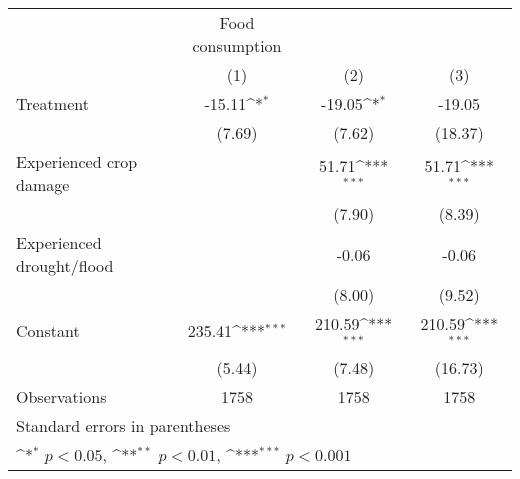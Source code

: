 {
\def\sym#1{\ifmmode^{#1}\else\(^{#1}\)\fi}
\begin{tabular}{l*{3}{c}}
\hline\hline
                    &Food consumption                                                 \\
                    &\multicolumn{1}{c}{(1)}         &\multicolumn{1}{c}{(2)}         &\multicolumn{1}{c}{(3)}         \\
\hline
Treatment           &      -15.11\sym{*}  &      -19.05\sym{*}  &      -19.05         \\
                    &      (7.69)         &      (7.62)         &     (18.37)         \\
[1em]
Experienced crop damage&                     &       51.71\sym{***}&       51.71\sym{***}\\
                    &                     &      (7.90)         &      (8.39)         \\
[1em]
Experienced drought/flood&                     &       -0.06         &       -0.06         \\
                    &                     &      (8.00)         &      (9.52)         \\
[1em]
Constant            &      235.41\sym{***}&      210.59\sym{***}&      210.59\sym{***}\\
                    &      (5.44)         &      (7.48)         &     (16.73)         \\
\hline
Observations        &        1758         &        1758         &        1758         \\
\hline\hline
\multicolumn{4}{l}{\footnotesize Standard errors in parentheses}\\
\multicolumn{4}{l}{\footnotesize \sym{*} \(p<0.05\), \sym{**} \(p<0.01\), \sym{***} \(p<0.001\)}\\
\end{tabular}
}
